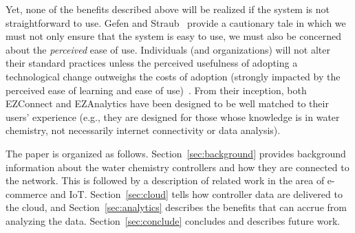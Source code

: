 Yet, none of the benefits described above will be realized if
the system is not straightforward to use.
Gefen and Straub~\cite{gefen2000} provide a cautionary tale
in which we must not only ensure that the system is easy to use,
we must also be concerned about the \emph{perceived} ease of use.
Individuals (and organizations) will not alter their standard
practices unless the perceived usefulness of adopting a technological
change outweighs the costs of adoption (strongly impacted by
the perceived ease of learning and ease of use)~\cite{Davis89}.
From their inception, both EZConnect and EZAnalytics have been
designed to be well matched to their users' experience
(e.g., they are designed for those whose knowledge is in
water chemistry, not necessarily internet connectivity or data analysis).

The paper is organized as follows. Section~\ref{sec:background}
provides background information about the water chemistry controllers
and how they are connected to the network.  This is followed by a
description of related work in the area of e-commerce and IoT.
Section~\ref{sec:cloud} tells how controller data are delivered to
the cloud, and Section~\ref{sec:analytics} describes the benefits
that can accrue from analyzing the data.
Section~\ref{sec:conclude} concludes and describes future work.

